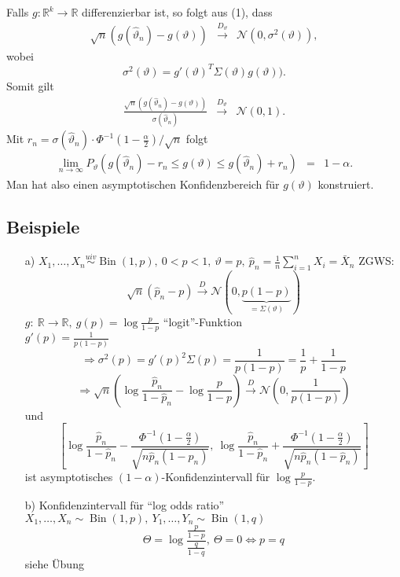 \documentclass[a4paper,11pt,twoside,titlepage]{article}
\newcommand{\R}{{\mathbb R}}
\newcommand\NN{ \mathcal{N} } %
\newcommand{\uiv}{\ensuremath{\stackrel{uiv}{\sim}}}
\DeclareMathOperator{\Bin}{Bin}
\begin{document}
Falls $g:\R^k\rightarrow\R$ differenzierbar ist, so folgt aus (1), dass
\begin{eqnarray*}
 \sqrt{n} (g(\hat{\vartheta}_n)-g(\vartheta)) &\stackrel{D_\vartheta}{\longrightarrow}&
  \NN(0,\sigma^2(\vartheta)),
\end{eqnarray*}
wobei
$$\sigma^2(\vartheta)=g'(\vartheta)^T \Sigma(\vartheta) g(\vartheta)).$$
Somit gilt
\begin{eqnarray*}
 \frac{ \sqrt{n} (g(\hat{\vartheta}_n)-g(\vartheta))}{\sigma(\hat{\vartheta}_n)}
  &\stackrel{D_\vartheta}{\longrightarrow}& \NN(0,1).
\end{eqnarray*}
Mit $r_n = \sigma(\hat{\vartheta}_n) \cdot \Phi^{-1}\left(1-\frac{\alpha}{2}\right)/\sqrt{n}$
folgt
\begin{eqnarray*}
 \lim_{n\to\infty} P_\vartheta\left( g(\hat{\vartheta}_n) - r_n \leq g(\vartheta)
  \leq g(\hat{\vartheta}_n) + r_n \right) &=& 1-\alpha.
\end{eqnarray*}
Man hat also einen asymptotischen Konfidenzbereich f\"ur $g(\vartheta)$ konstruiert.

\subsection{Beispiele}%
\begin{itemize}
\item[a) ]$X_1,\ldots,X_n\uiv\Bin(1,p),\ 0<p<1,\ \vartheta=p,\ \hat{p}_n=\frac1n\sum_{i=1}^nX_i=\bar{X}_n$
ZGWS:\[\sqrt{n}(\hat{p}_n-p)\stackrel{D}{\rightarrow}\NN(0,\underbrace{p(1-p)}_{=\Sigma(\vartheta)})\]
$g:\ \R\rightarrow\R,\ g(p)=\log\frac{p}{1-p}$ "`logit"'-Funktion\\
$g'(p)=\frac{1}{p(1-p)}$
\[\Rightarrow\sigma^2(p)=g'(p)^2\Sigma(p)=\frac{1}{p(1-p)}=\frac1p+\frac{1}{1-p}\]
\[\Rightarrow\sqrt{n}(\log\frac{\hat{p}_n}{1-\hat{p}_n}-\log\frac{p}{1-p})\stackrel{D}{\rightarrow}\NN(0,\frac{1}{p(1-p)})\]
und \[[\log\frac{\hat{p}_n}{1-\hat{p}_n}-\frac{\Phi^{-1}(1-\frac{\alpha}{2})}{\sqrt{n\hat{p}_n(1-\hat{p}_n)}},\ 
\log\frac{\hat{p}_n}{1-\hat{p}_n}+\frac{\Phi^{-1}(1-\frac{\alpha}{2})}{\sqrt{n\hat{p}_n(1-\hat{p}_n)}}]\]
ist asymptotisches $(1-\alpha)$-Konfidenzintervall für $\log\frac{p}{1-p}$.
\item[b) ]Konfidenzintervall für "`log odds ratio"'\\
 $X_1,\ldots,X_n\sim\Bin(1,p),\ Y_1,\ldots,Y_n\sim\Bin(1,q)$
\[\Theta=\log\frac{\frac{p}{1-p}}{\frac{q}{1-q}},\ \Theta=0\Leftrightarrow p=q\]
siehe Übung
\end{itemize}
\end{document}
